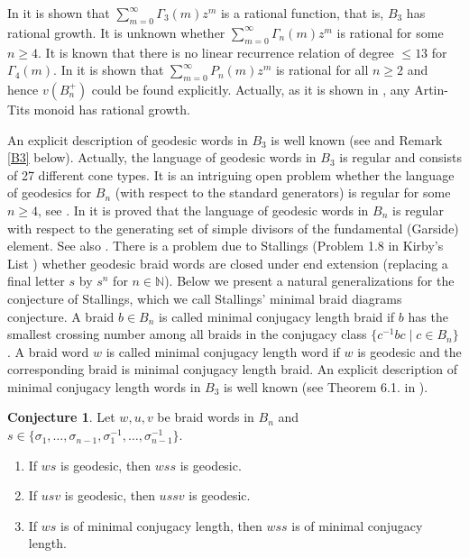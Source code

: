 \documentclass[11pt]{amsart}
\theoremstyle{plain}
\theoremstyle{definition}
\newtheorem{conjecture}[Theorem]{Conjecture}
\numberwithin{equation}{section}
\begin{document}
In \cite{Sabalka} it is shown that $\sum_{m=0}^\infty \Gamma_3(m) z^m$ is a rational function, that is, $B_3$ has rational growth. It is unknown whether $\sum_{m=0}^\infty \Gamma_n(m) z^m$ is rational for some $n \geq 4$. It is known that there is no linear recurrence relation of degree $\leq 13$ for $\Gamma_4(m)$. In \cite{Deligne,Xu} it is shown that $\sum_{m=0}^\infty P_n(m) z^m$ is rational for all $n \geq 2$ and hence $v(B_n^+)$ could be found explicitly. Actually, as it is shown in \cite{Saito}, any Artin-Tits monoid has rational growth. 

An explicit description of geodesic words in $B_3$ is well known (see \cite{Sabalka,Berger} and Remark \ref{B3} below). Actually, the language of geodesic words in $B_3$ is regular and consists of 27 different cone types. It is an intriguing open problem whether the language of geodesics for $B_n$ (with respect to the standard generators) is regular for some $n\geq 4$, see \cite{Mairesse}. In \cite{CharneyMeier} it is proved that the language of geodesic words in $B_n$ is regular with respect to the generating set of simple divisors of the fundamental (Garside) element. See also \cite{Charney1,Charney2,Dehornoy,Brazil}. There is a problem due to Stallings (Problem 1.8 in Kirby's List \cite{K}) whether geodesic braid words are closed under end extension (replacing a final letter $s$ by $s^n$ for $n \in \mathbb{N}$). Below we present a natural generalizations for the conjecture of Stallings, which we call Stallings' minimal braid diagrams conjecture. A braid $b \in B_n$ is called minimal conjugacy length braid if $b$ has the smallest crossing number among all braids in the conjugacy class $\{c^{-1}bc \mid c \in B_n\}$. A braid word $w$ is called minimal conjugacy length word if $w$ is geodesic and the corresponding braid is minimal conjugacy length braid. An explicit description of minimal conjugacy length words in $B_3$ is well known (see Theorem 6.1. in \cite{AS}).

\begin{conjecture}\label{SMBC}
Let $w,u,v$ be braid words in $B_n$ and $s \in \{\sigma_1, \ldots, \sigma_{n-1},\sigma_1^{-1}, \ldots, \sigma_{n-1}^{-1}\}$.
\begin{enumerate}
\item If $ws$ is geodesic, then $wss$ is geodesic.
\item If $usv$ is geodesic, then $ussv$ is geodesic.
\item If $ws$ is of minimal conjugacy length, then $wss$ is of minimal conjugacy length.
\end{enumerate}
\end{conjecture}
\end{document}
